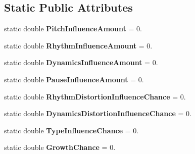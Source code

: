 \subsection*{Static Public Attributes}
\begin{DoxyCompactItemize}
\item 
\hypertarget{class_music_population_1_1_member2_acc6a6df1d3a59bfbc5a98079f7380d0a}{static double {\bfseries Pitch\+Influence\+Amount} = 0.}\label{class_music_population_1_1_member2_acc6a6df1d3a59bfbc5a98079f7380d0a}

\item 
\hypertarget{class_music_population_1_1_member2_aa32e3d4e5efd44ffcc61800131879222}{static double {\bfseries Rhythm\+Influence\+Amount} = 0.}\label{class_music_population_1_1_member2_aa32e3d4e5efd44ffcc61800131879222}

\item 
\hypertarget{class_music_population_1_1_member2_a69db93212a8844ddeea740a67f0e3549}{static double {\bfseries Dynamics\+Influence\+Amount} = 0.}\label{class_music_population_1_1_member2_a69db93212a8844ddeea740a67f0e3549}

\item 
\hypertarget{class_music_population_1_1_member2_a0cc907c865be2515d8fefe7daf96eab3}{static double {\bfseries Pause\+Influence\+Amount} = 0.}\label{class_music_population_1_1_member2_a0cc907c865be2515d8fefe7daf96eab3}

\item 
\hypertarget{class_music_population_1_1_member2_a0f6c8ffe0039644b06a0a57f7253a6d4}{static double {\bfseries Rhythm\+Distortion\+Influence\+Chance} = 0.}\label{class_music_population_1_1_member2_a0f6c8ffe0039644b06a0a57f7253a6d4}

\item 
\hypertarget{class_music_population_1_1_member2_a3fe5b6a8392f753bb7e39aaa21f219fd}{static double {\bfseries Dynamics\+Distortion\+Influence\+Chance} = 0.}\label{class_music_population_1_1_member2_a3fe5b6a8392f753bb7e39aaa21f219fd}

\item 
\hypertarget{class_music_population_1_1_member2_ab9ca3b61729112b343104e154150b82d}{static double {\bfseries Type\+Influence\+Chance} = 0.}\label{class_music_population_1_1_member2_ab9ca3b61729112b343104e154150b82d}

\item 
\hypertarget{class_music_population_1_1_member2_ab889e8c8c0bbce32ec788ded5a98fbdf}{static double {\bfseries Growth\+Chance} = 0.}\label{class_music_population_1_1_member2_ab889e8c8c0bbce32ec788ded5a98fbdf}


\end{DoxyCompactItemize}
